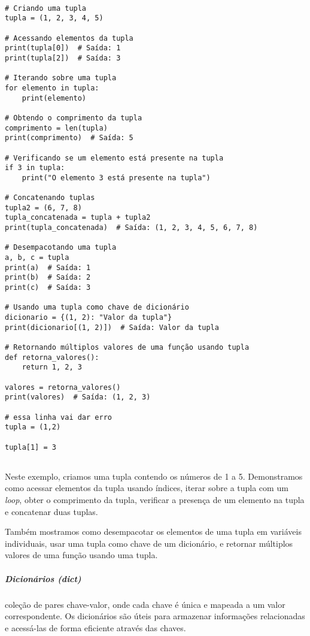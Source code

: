 \documentclass[a4paper, 12pt, onecolumn,singlespacing]{article}
\begin{document}
	\begin{verbatim}
		
# Criando uma tupla
tupla = (1, 2, 3, 4, 5)

# Acessando elementos da tupla
print(tupla[0])  # Saída: 1
print(tupla[2])  # Saída: 3

# Iterando sobre uma tupla
for elemento in tupla:
	print(elemento)

# Obtendo o comprimento da tupla
comprimento = len(tupla)
print(comprimento)  # Saída: 5

# Verificando se um elemento está presente na tupla
if 3 in tupla:
	print("O elemento 3 está presente na tupla")

# Concatenando tuplas
tupla2 = (6, 7, 8)
tupla_concatenada = tupla + tupla2
print(tupla_concatenada)  # Saída: (1, 2, 3, 4, 5, 6, 7, 8)

# Desempacotando uma tupla
a, b, c = tupla
print(a)  # Saída: 1
print(b)  # Saída: 2
print(c)  # Saída: 3

# Usando uma tupla como chave de dicionário
dicionario = {(1, 2): "Valor da tupla"}
print(dicionario[(1, 2)])  # Saída: Valor da tupla

# Retornando múltiplos valores de uma função usando tupla
def retorna_valores():
	return 1, 2, 3

valores = retorna_valores()
print(valores)  # Saída: (1, 2, 3)

# essa linha vai dar erro
tupla = (1,2)

tupla[1] = 3
		
	\end{verbatim}

Neste exemplo, criamos uma tupla contendo os números de 1 a 5. Demonstramos como acessar elementos da tupla usando índices, iterar sobre a tupla com um \textit{loop}, obter o comprimento da tupla, verificar a presença de um elemento na tupla e concatenar duas tuplas.

Também mostramos como desempacotar os elementos de uma tupla em variáveis individuais, usar uma tupla como chave de um dicionário, e retornar múltiplos valores de uma função usando uma tupla.

	\subparagraph{Dicionários (\textit{dict})} \label{python_estrutura_dict} coleção de pares chave-valor, onde cada chave é única e mapeada a um valor correspondente. Os dicionários são úteis para armazenar informações relacionadas e acessá-las de forma eficiente através das chaves.
	
\end{document}
